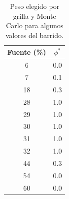 \begin{table}[H]
\centering
\small
\begin{tabular}{@{}cc@{}}
\toprule
\textbf{Fuente (\%)} & $\phi^*$ \\
\midrule
6 & 0.0 \\
7 & 0.1 \\
18 & 0.3 \\
28 & 1.0 \\
29 & 1.0 \\
30 & 1.0 \\
31 & 1.0 \\
32 & 1.0 \\
44 & 0.3 \\
54 & 0.0 \\
60 & 0.0 \\
\bottomrule
\end{tabular}
\caption{Peso elegido por grilla y Monte Carlo para algunos valores del barrido.}
\label{tab:sensibilidad}
\end{table}
